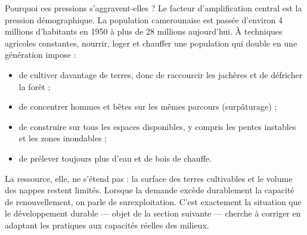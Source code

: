 \documentclass[11pt]{article}
\newcommand{\cle}[1]{{\popxbold\color{popdark}#1}}
\begin{document}
Pourquoi ces pressions s'aggravent-elles ? Le facteur d'amplification central est la \cle{pression démographique}. La population camerounaise est passée d'environ 4 millions d'habitants en 1950 à plus de 28 millions aujourd'hui. À techniques agricoles constantes, nourrir, loger et chauffer une population qui double en une génération impose :
\begin{itemize}
\item de cultiver davantage de terres, donc de raccourcir les jachères et de défricher la forêt ;
\item de concentrer hommes et bêtes sur les mêmes parcours (surpâturage) ;
\item de construire sur tous les espaces disponibles, y compris les pentes instables et les zones inondables ;
\item de prélever toujours plus d'eau et de bois de chauffe.
\end{itemize}
La ressource, elle, ne s'étend pas : la surface des terres cultivables et le volume des nappes restent limités. Lorsque la demande excède durablement la capacité de renouvellement, on parle de \cle{surexploitation}. C'est exactement la situation que le développement durable — objet de la section suivante — cherche à corriger en adaptant les pratiques aux capacités réelles des milieux.
\end{document}
